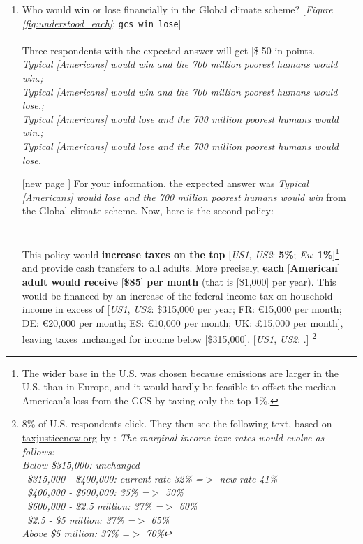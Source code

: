 \begin{enumerate}[resume]
\item  \label{q:understood_gcs} Who would win or lose financially in the Global climate scheme? [\textit{Figure \ref{fig:understood_each}}; \verb|gcs_win_lose|] \\
\\
Three respondents with the expected answer will get [\$]50 in points.
\\ \textit{Typical [Americans] would win and the 700 million poorest humans would win.; \\Typical [Americans] would win and the 700 million poorest humans would lose.; \\Typical [Americans] would lose and the 700 million poorest humans would win.; \\Typical [Americans] would lose and the 700 million poorest humans would lose.}
\item[[new page\!\!\!]] For your information, the expected answer was \textit{Typical [Americans] would lose and the 700 million poorest humans would win} from the Global climate scheme. Now, here is the second policy: \\ 
\\
\textbf{}\\ This policy would \textbf{increase taxes on the top} [\textit{US1}, \textit{US2}: \textbf{5\%}; 
\textit{Eu}: \textbf{1\%}]\footnote{The wider base in the U.S. was chosen because emissions are larger in the U.S. than in Europe, and it would hardly be feasible to offset the median American's loss from the GCS by taxing only the top 1\%.} and provide cash transfers to all adults. More precisely, \textbf{each }[\textbf{American}]\textbf{ adult would receive }[\textbf{\$85}]\textbf{ per month} (that is [\$1,000] per year). 
This would be financed by an increase of the federal income tax on household income in excess of [\textit{US1}, \textit{US2}: \$315,000 per year; FR: \euro{}15,000 per month; DE: \euro{}20,000 per month; ES: \euro{}10,000 per month; UK: £15,000 per month], leaving taxes unchanged for income below [\$315,000]. [\textit{US1}, \textit{US2}: .]
\footnote{8\% of U.S. respondents click. They then see the following text, based on \href{https://taxjusticenow.org/\#makeYourOwnTaxPlan}{taxjusticenow.org} by : \textit{The marginal income taxe rates would evolve as follows:\\Below \$315,000: unchanged \\ ~\$315,000 - \$400,000: current rate 32\% =$>$ new rate 41\% \\ ~\$400,000 - \$600,000: 35\% =$>$ 50\% \\ ~\$600,000 - \$2.5 million: 37\% =$>$ 60\% \\ ~\$2.5 - \$5 million: 37\% =$>$ 65\% \\ Above \$5 million: 37\% =$>$ 70\%}}

\end{enumerate}
